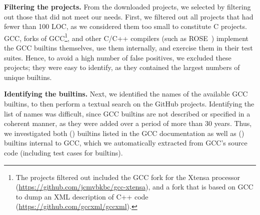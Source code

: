 \documentclass[sigconf,screen]{acmart}
\renewcommand{\paragraph}[1]{\textbf{#1}}
\newcommand{\RNum}[1]{\uppercase\expandafter{\romannumeral #1\relax}}
\begin{document}
\begin{table}[!htbp]
    \footnotesize
    \projectstatstable{}
\end{table}

\paragraph{Filtering the projects.}
From the downloaded projects, we selected \nrProjects{} by filtering out those that did not meet our needs.
First, we filtered out all projects that had fewer than 100 LOC, as we considered them too small to constitute C projects.
GCC, forks of GCC\footnote{The projects filtered out included the GCC fork for the Xtensa processor (\url{https://github.com/jcmvbkbc/gcc-xtensa}), and a fork that is based on GCC to dump an XML description of C++ code (\url{https://github.com/gccxml/gccxml}).}, and other C/C++ compilers (such as ROSE~\cite{rose}) implement the GCC builtins themselves, use them internally, and exercise them in their test suites.
Hence, to avoid a high number of false positives, we excluded these projects; they were easy to identify, as they contained the largest numbers of unique builtins.

\paragraph{Identifying the builtins.}
Next, we identified the names of the available GCC builtins, to then perform a textual search on the GitHub projects.
Identifying the list of names was difficult, since GCC builtins are not described or specified in a coherent manner, as they were added over a period of more than 30 years.
Thus, we investigated both (\RNum{1}) builtins listed in the GCC documentation as well as (\RNum{2}) builtins internal to GCC, which we automatically extracted from GCC's source code (including test cases for builtins).
\end{document}
